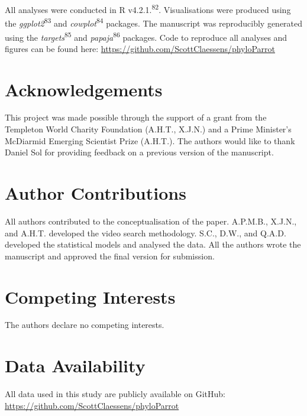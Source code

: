\documentclass[
  man,floatsintext]{apa6}
\begin{document}
All analyses were conducted in R v4.2.1.\textsuperscript{82}. Visualisations were produced using the \emph{ggplot2}\textsuperscript{83} and \emph{cowplot}\textsuperscript{84} packages. The manuscript was reproducibly generated using the \emph{targets}\textsuperscript{85} and \emph{papaja}\textsuperscript{86} packages. Code to reproduce all analyses and figures can be found here: \url{https://github.com/ScottClaessens/phyloParrot}

\newpage
\nolinenumbers

\hypertarget{acknowledgements}{%
\section{Acknowledgements}\label{acknowledgements}}

This project was made possible through the support of a grant from the Templeton World Charity Foundation (A.H.T., X.J.N.) and a Prime Minister's McDiarmid Emerging Scientist Prize (A.H.T.). The authors would like to thank Daniel Sol for providing feedback on a previous version of the manuscript.

\hypertarget{author-contributions}{%
\section{Author Contributions}\label{author-contributions}}

All authors contributed to the conceptualisation of the paper. A.P.M.B., X.J.N., and A.H.T. developed the video search methodology. S.C., D.W., and Q.A.D. developed the statistical models and analysed the data. All the authors wrote the manuscript and approved the final version for submission.

\hypertarget{competing-interests}{%
\section{Competing Interests}\label{competing-interests}}

The authors declare no competing interests.

\hypertarget{data-availability}{%
\section{Data Availability}\label{data-availability}}

All data used in this study are publicly available on GitHub: \url{https://github.com/ScottClaessens/phyloParrot}
\end{document}
